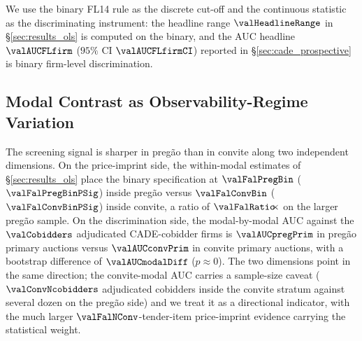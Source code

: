 

We use the binary FL14 rule as the discrete cut-off and the
continuous statistic as the discriminating instrument: the
headline range $\valHeadlineRange$ in \S\ref{sec:results_ols} is
computed on the binary, and the AUC headline $\valAUCFLfirm$
($95\%$ CI $\valAUCFLfirmCI$) reported in
\S\ref{sec:cade_prospective} is binary firm-level discrimination.

\subsection{Modal Contrast as Observability-Regime Variation}
\label{sec:mech_modal}

The screening signal is sharper in preg\~ao than in convite
along two independent dimensions. On the price-imprint side, the
within-modal estimates of \S\ref{sec:results_ols} place the
binary specification at $\valFalPregBin$ ($\valFalPregBinPSig$)
inside preg\~ao versus $\valFalConvBin$ ($\valFalConvBinPSig$)
inside convite, a ratio of $\valFalRatio\!\!\times$ on the larger
preg\~ao sample. On the discrimination side, the modal-by-modal
AUC against the $\valCobidders$ adjudicated CADE-cobidder firms
is $\valAUCpregPrim$ in preg\~ao primary auctions versus
$\valAUCconvPrim$ in convite primary auctions, with a bootstrap
difference of $\valAUCmodalDiff$ ($p\approx 0$). The two
dimensions point in the same direction; the convite-modal AUC
carries a sample-size caveat ($\valConvNcobidders$ adjudicated
cobidders inside the convite stratum against several dozen on
the preg\~ao side) and we treat it as a directional indicator,
with the much larger $\valFalNConv$-tender-item price-imprint
evidence carrying the statistical weight.

